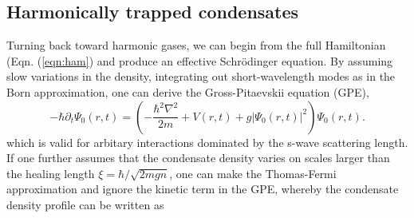 

	
	
	
\subsection*{Harmonically trapped condensates}

	Turning back toward harmonic gases, we can begin from the full Hamiltonian (Eqn.
	(\ref{eqn:ham}) and produce an effective Schr\"{o}dinger equation.
	By assuming slow variations in the density, integrating out short-wavelength modes as in the Born approximation, one can derive the Gross-Pitaevskii equation (GPE),
	\begin{equation}
		-\hbar\partial_t\Psi_0(r,t) = \left(-\frac{\hbar^2\nabla^2}{2m} + V(r,t) + g|\Psi_0(r,t)|^2\right)\Psi_0(r,t).
		\label{eqn:GPE}
	\end{equation}
	which is valid for arbitary interactions dominated by the s-wave scattering length.
	 If one further assumes that the condensate density varies on scales larger than the healing length $\xi = \hbar/\sqrt{2mgn}$, one can make the Thomas-Fermi approximation and ignore the kinetic term in the GPE, whereby the condensate density profile can be written as

